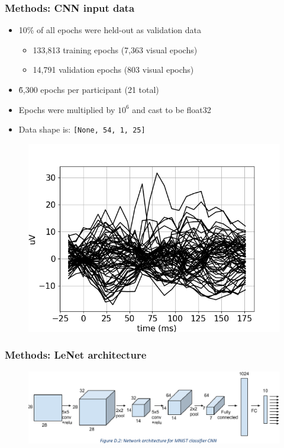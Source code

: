 \documentclass{beamer}
\begin{document}
\begin{frame}
	\frametitle{Methods: CNN input data}
	
	\begin{itemize}

		\item 10\% of all epochs were held-out as validation data
		\begin{itemize}
			\item 133,813 training epochs (7,363 visual epochs)
			\item 14,791 validation epochs (803 visual epochs)
		\end{itemize}

		\item \~6,300 epochs per participant (21 total)
	
		\item Epochs were multiplied by $10^6$ and cast to be float32

		\item Data shape is: \texttt{[None, 54, 1, 25]}

	\end{itemize}

	\begin{figure}
		\centering
		\includegraphics[scale=0.85]{fig12.png}
	\end{figure}

\end{frame}

\begin{frame}
	\frametitle{Methods: LeNet architecture}

	\begin{figure}
		\centering
		\includegraphics[scale=0.85]{fig13.png}
	\end{figure}
	
\end{frame}
\end{document}
